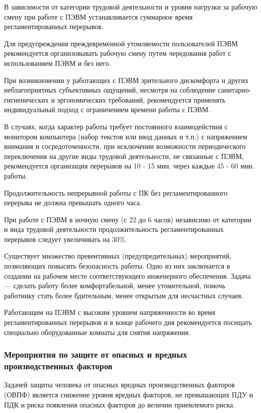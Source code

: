 В зависимости от категории трудовой деятельности и уровня нагрузки за рабочую смену при работе с ПЭВМ устанавливается суммарное время регламентированных перерывов.

Для предупреждения преждевременной утомляемости пользователей ПЭВМ рекомендуется организовывать рабочую смену путем чередования работ с использованием ПЭВМ и без него.

При возникновении у работающих с ПЭВМ зрительного дискомфорта и других неблагоприятных субъективных ощущений, несмотря на соблюдение санитарно-гигиенических и эргономических требований, рекомендуется применять индивидуальный подход с ограничением времени работы с ПЭВМ.

В случаях, когда характер работы требует постоянного взаимодействия с монитором компьютера (набор текстов или ввод данных и т.п.) с напряжением внимания и сосредоточенности, при исключении возможности периодического переключения на другие виды трудовой деятельности, не связанные с ПЭВМ, рекомендуется организация перерывов на 10 - 15 мин. через каждые 45 - 60 мин. работы.

Продолжительность непрерывной работы с ПК без регламентированного перерыва не должна превышать одного часа.

При работе с ПЭВМ в ночную смену (с 22 до 6 часов) независимо от категории и вида трудовой деятельности продолжительность регламентированных перерывов следует увеличивать на 30\%.

Существует множество превентивных (предупредительных) мероприятий, позволяющих повысить безопасность работы.
Одно из них заключается в создании на рабочем месте соответствующего инженерного обеспечения. Задача --- сделать работу более комфортабельной, менее утомительной, помочь работнику стать более бдительным, менее открытым для несчастных случаев.

Работающим на ПЭВМ с высоким уровнем напряженности во время регламентированных перерывов и в конце рабочего дня рекомендуется посещать специально оборудованные комнаты для снятия напряжения.

\subsubsection{Мероприятия по защите от опасных и вредных производственных факторов}

Задачей защиты человека от опасных вредных производственных факторов (ОВПФ) является снижение уровня вредных факторов, не превышающих ПДУ и ПДК и риска появления опасных факторов до величин приемлемого риска.

